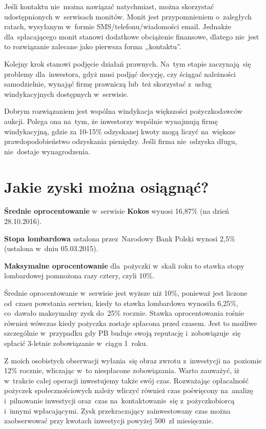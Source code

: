 \documentclass[a4paper,twoside,titlepage,openright]{book}
\begin{document}
Jeśli kontaktu nie~można nawiązać natychmiast, można skorzystać udostępnionych w~serwisach monitów. Monit jest przypomnieniem o~zaległych ratach, wysyłanym w~formie SMS/telefonu/wiadomości email. Jednakże dla~spłacającego monit stanowi dodatkowe obciążenie finansowe, dlatego nie~jest to rozwiązanie zalecane jako pierwsza forma ,,kontaktu''. 

Kolejny krok stanowi podjęcie działań prawnych. Na~tym etapie zaczynają~się problemy dla~inwestora, gdyż musi podjąć decyzję, czy ściągać należności samodzielnie, wynająć firmę prawniczą lub~też skorzystać z~usług windykacyjnych dostępnych w~serwisie. 

Dobrym rozwiązaniem jest wspólna windykacja większości pożyczkodawców aukcji. Polega ona na~tym, że inwestorzy wspólnie wynajmują firmę windykacyjną, gdzie za 10-15\% odzyskanej kwoty mogą liczyć na~większe prawdopodobieństwo odzyskania pieniędzy. Jeśli firma nie~odzyska długu, nie~dostaje wynagrodzenia.


\section{Jakie zyski można osiągnąć?}

\textbf{Średnie oprocentowanie} w~serwisie \textbf{Kokos} wynosi 16,87\% \cite{zostanInwestorem} (na dzień 28.10.2016).

\textbf{Stopa lombardowa} ustalona przez~Narodowy Bank Polski wynosi 2,5\% \cite{stopy} (ustalona w~dniu 05.03.2015).
 
\textbf{Maksymalne oprocentowanie} dla~pożyczki w~skali roku to stawka stopy lombardowej pomnożona razy cztery, czyli 10\%.

Średnie oprocentowanie w~serwisie jest wyższe niż 10\%, ponieważ jest liczone od~czasu powstania serwisu, kiedy to stawka lombardowa wynosiła 6,25\%, co~dawało maksymalny zysk do~25\% rocznie. Stawka oprocentowania rośnie również wówczas kiedy pożyczka zostaje spłacona przed czasem. Jest to możliwe szczególnie w~przypadku gdy PB buduje swoją reputację i~zobowiązuje~się spłacić \mbox{3-letnie} zobowiązanie w~ciągu 1~roku. 

Z moich osobistych obserwacji wyłania~się obraz zwrotu z~inwestycji na~poziomie 12\% rocznie, wliczając w~to niespłacone zobowiązania. Warto zauważyć, iż w~trakcie całej operacji inwestujemy także swój czas. Rozważając opłacalność pożyczek społecznościowych należy wliczyć również czas poświęcony na~analizę i~pilnowanie inwestycji oraz~czas na~kontaktowanie~się z~pożyczkobiorcą i~innymi wpłacającymi. Zysk przekraczający zainwestowany czas można zaobserwować przy kwotach inwestycji powyżej 500~zł miesięcznie. 
\end{document}
